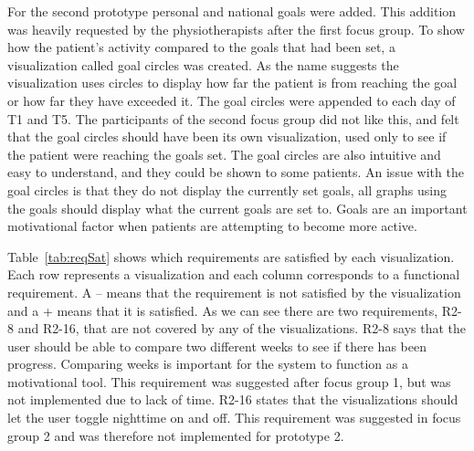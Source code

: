 For the second prototype personal and national goals were added. This addition was heavily requested by the physiotherapists after the first focus group. To show how the patient's activity compared to the goals that had been set, a visualization called goal circles was created. As the name suggests the visualization uses circles to display how far the patient is from reaching the goal or how far they have exceeded it. The goal circles were appended to each day of T1 and T5. The participants of the second focus group did not like this, and felt that the goal circles should have been its own visualization, used only to see if the patient were reaching the goals set. The goal circles are also intuitive and easy to understand, and they could be shown to some patients. An issue with the goal circles is that they do not display the currently set goals, all graphs using the goals should display what the current goals are set to. Goals are an important motivational factor when patients are attempting to become more active.

Table~\ref{tab:reqSat} shows which requirements are satisfied by each visualization. Each row represents a visualization and each column corresponds to a functional requirement. A -- means that the requirement is not satisfied by the visualization and a + means that it is satisfied. As we can see there are two requirements, R2-8 and R2-16, that are not covered by any of the visualizations. R2-8 says that the user should be able to compare two different weeks to see if there has been progress. Comparing weeks is important for the system to function as a motivational tool. This requirement was suggested after focus group 1, but was not implemented due to lack of time. R2-16 states that the visualizations should let the user toggle nighttime on and off. This requirement was suggested in focus group 2 and was therefore not implemented for prototype 2.
\begin{table}[h!]
  \centering
  \caption[Requirements and visualizations]{The table shows which requirements each visualization satisfies.}
  \label{tab:reqSat}
\end{table} 

